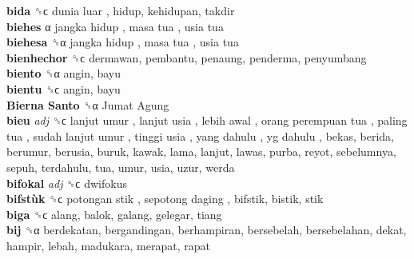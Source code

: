 \textbf{bida} ␝ϲ   dunia luar , hidup, kehidupan, takdir  \\
\textbf{biehes} α   jangka hidup ,  masa tua ,  usia tua   \\
\textbf{biehesa} ␝α   jangka hidup ,  masa tua ,  usia tua   \\
\textbf{bienhechor} ␝ϲ  dermawan, pembantu, penaung, penderma, penyumbang  \\
\textbf{biento} ␝α  angin, bayu  \\
\textbf{bientu} ␝ϲ  angin, bayu  \\
\textbf{Bierna Santo} ␝α   Jumat Agung   \\
\textbf{bieu} \emph{adj}  ␝ϲ   lanjut umur ,  lanjut usia ,  lebih awal ,  orang perempuan tua ,  paling tua ,  sudah lanjut umur ,  tinggi usia ,  yang dahulu ,  yg dahulu , bekas, berida, berumur, berusia, buruk, kawak, lama, lanjut, lawas, purba, reyot, sebelumnya, sepuh, terdahulu, tua, umur, usia, uzur, werda  \\
\textbf{bifokal} \emph{adj}  ␝ϲ  dwifokus  \\
\textbf{bifstùk} ␝ϲ   potongan stik ,  sepotong daging , bifstik, bistik, stik  \\
\textbf{biga} ␝ϲ  alang, balok, galang, gelegar, tiang  \\
\textbf{bij} ␝α  berdekatan, bergandingan, berhampiran, bersebelah, bersebelahan, dekat, hampir, lebah, madukara, merapat, rapat  \\
